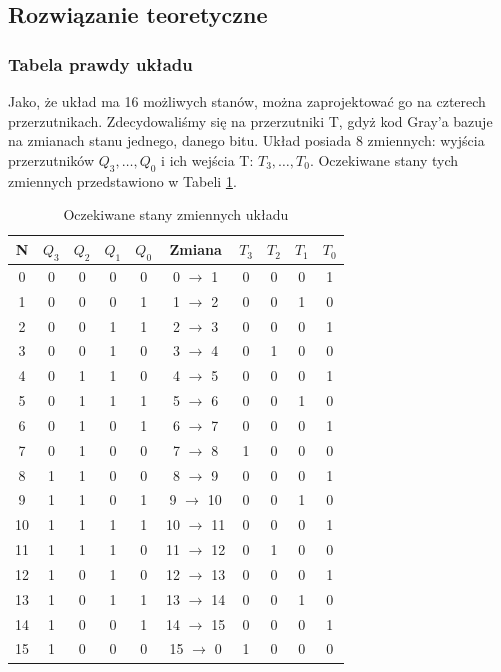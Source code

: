 \documentclass[12pt,a4paper,table]{article}
\begin{document}
    \pagebreak
    \subsection{Rozwiązanie teoretyczne}
    \subsubsection{Tabela prawdy układu}
    Jako, że układ ma 16 możliwych stanów, można zaprojektować go na czterech przerzutnikach. 
    Zdecydowaliśmy się na przerzutniki T, gdyż kod Gray'a bazuje na zmianach stanu jednego, danego bitu.
    Układ posiada 8 zmiennych: wyjścia przerzutników $Q_3, \dots, Q_0$ i ich wejścia T: $T_3, \dots, T_0$.
    Oczekiwane stany tych zmiennych przedstawiono w Tabeli \ref{tab:gray_states}.

    \begin{table}[h]
        \centering
        \begin{tabular}{|c|cccc|c|cccc|} 
            \hline
            N & $Q_3$ & $Q_2$ & $Q_1$ & $Q_0$ & Zmiana & $T_3$ & $T_2$ & $T_1$ & $T_0$ \\ \hline
            0&	0&	0&	0&	0&	0 $\rightarrow$ 1&	    0&	0&	0&	1 \\
            1&	0&	0&	0&	1&	1 $\rightarrow$ 2&	    0&	0&	1&	0 \\
            2&	0&	0&	1&	1&	2 $\rightarrow$ 3&	    0&	0&	0&	1 \\
            3&	0&	0&	1&	0&	3 $\rightarrow$ 4&	    0&	1&	0&	0 \\
            4&	0&	1&	1&	0&	4 $\rightarrow$ 5&	    0&	0&	0&	1 \\
            5&	0&	1&	1&	1&	5 $\rightarrow$ 6&	    0&	0&	1&	0 \\
            6&	0&	1&	0&	1&	6 $\rightarrow$ 7&	    0&	0&	0&	1 \\
            7&	0&	1&	0&	0&	7 $\rightarrow$ 8&	    1&	0&	0&	0 \\
            8&	1&	1&	0&	0&	8 $\rightarrow$ 9&	    0&	0&	0&	1 \\
            9&	1&	1&	0&	1&	9 $\rightarrow$ 10&    0&	0&	1&	0 \\
            10&	1&	1&	1&	1&	10 $\rightarrow$ 11&	0&	0&	0&	1 \\
            11&	1&	1&	1&	0&	11 $\rightarrow$ 12&	0&	1&	0&	0 \\
            12&	1&	0&	1&	0&	12 $\rightarrow$ 13&	0&	0&	0&	1 \\
            13&	1&	0&	1&	1&	13 $\rightarrow$ 14&	0&	0&	1&	0 \\
            14&	1&	0&  0&	1&	14 $\rightarrow$ 15&	0&	0&	0&	1 \\
            15&	1&	0&	0&	0&	15 $\rightarrow$ 0&    1&	0&	0&	0 \\
            \hline
        \end{tabular}
        \caption{Oczekiwane stany zmiennych układu}
        \label{tab:gray_states}
    \end{table}
    
\end{document}
